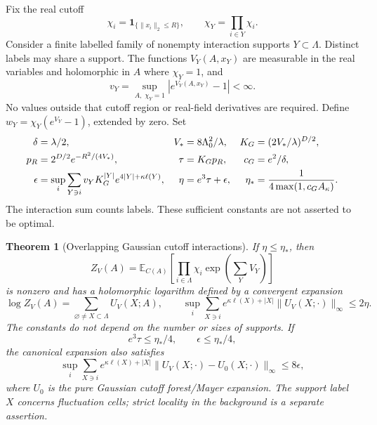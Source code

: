 \documentclass[11pt]{article}
\newtheorem{theorem}{Theorem}[section]
\begin{document}
Fix the real cutoff
\[
 \chi_i=\mathbf1_{\{\|x_i\|_2\le R\}},\qquad
 \chi_Y=\prod_{i\in Y}\chi_i.
\]
Consider a finite labelled family of nonempty interaction supports
$Y\subset\Lambda$. Distinct labels may share a support.
The functions $V_Y(A,x_Y)$ are measurable in the real variables and
holomorphic in $A$ where $\chi_Y=1$, and
\begin{equation}\label{oi-multiplier}
 v_Y=\sup_{A,\;\chi_Y=1}|e^{V_Y(A,x_Y)}-1|<\infty.
\end{equation}
No values outside that cutoff region or real-field derivatives are
required. Define $w_Y=\chi_Y(e^{V_Y}-1)$, extended by zero.
Set
\begin{align}
 \delta&=\lambda/2,&
 V_*&=8\Lambda_0^2/\lambda,&
 K_G&=(2V_*/\lambda)^{D/2},\notag\\
 p_R&=2^{D/2}e^{-R^2/(4V_*)},&
 \tau&=K_Gp_R,& c_G&=e^2/\delta,                 \label{oi-constants}\\
 \epsilon&=\sup_i\sum_{Y\ni i}
      v_Y K_G^{|Y|}e^{4|Y|+\kappa\ell(Y)},&
 \eta&=e^3\tau+\epsilon,&
 \eta_*&=\frac1{4\max(1,c_GA_\kappa)}.           \label{oi-smallness}
\end{align}
The interaction sum counts labels. These sufficient constants are
not asserted to be optimal.

\begin{theorem}[Overlapping Gaussian cutoff interactions]
\label{oi-theorem}
If $\eta\le\eta_*$, then
\[
 Z_V(A)=\mathbb E_{C(A)}
   \left[\prod_{i\in\Lambda}\chi_i
              \exp\left(\sum_YV_Y\right)\right]
\]
is nonzero and has a holomorphic logarithm defined by a convergent
expansion
\begin{equation}\label{oi-log}
 \log Z_V(A)=\sum_{\varnothing\ne X\subset\Lambda}U_V(X;A),\qquad
 \sup_i\sum_{X\ni i}e^{\kappa\ell(X)+|X|}
       \|U_V(X;\cdot)\|_\infty\le2\eta .
\end{equation}
The constants do not depend on the number or sizes of supports.
If
\begin{equation}\label{oi-quarter}
 e^3\tau\le\eta_*/4,\qquad \epsilon\le\eta_*/4,
\end{equation}
the canonical expansion also satisfies
\begin{equation}\label{oi-difference}
 \sup_i\sum_{X\ni i}e^{\kappa\ell(X)+|X|}
      \|U_V(X;\cdot)-U_0(X;\cdot)\|_\infty
 \le8\epsilon ,
\end{equation}
where $U_0$ is the pure Gaussian cutoff forest/Mayer expansion.
The support label $X$ concerns fluctuation cells; strict locality
in the background is a separate assertion.
\end{theorem}
\end{document}
